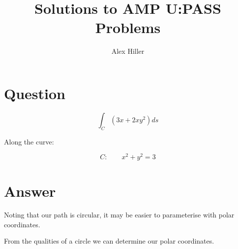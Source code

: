 \documentclass{article}
\author{Alex Hiller}
\title{Solutions to AMP U:PASS Problems}
\begin{document}

\maketitle
\clearpage

\section{Question}
\begin{equation}
  \int^{}_{C} \left( 3x + 2xy^{2}_{} \right) ds 
\end{equation}

Along the curve:

\begin{equation}
  C: \qquad x^{2}_{} + y^{2}_{} = 3
\end{equation}

\section{Answer}
Noting that our path is circular, it may be easier to parameterise with polar coordinates.

From the qualities of a circle we can determine our polar coordinates. 
\end{document}
